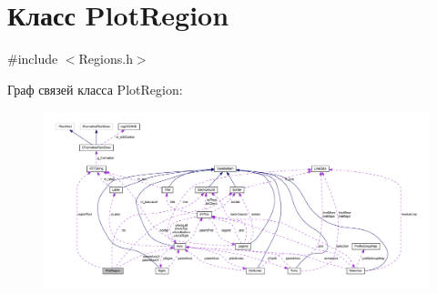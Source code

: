 \hypertarget{class_plot_region}{\section{Класс Plot\-Region}
\label{class_plot_region}
}


{\ttfamily \#include $<$Regions.\-h$>$}



Граф связей класса Plot\-Region\-:
\nopagebreak
\begin{figure}[H]
\begin{center}
\leavevmode
\includegraphics[width=350pt]{class_plot_region__coll__graph}
\end{center}
\end{figure}
